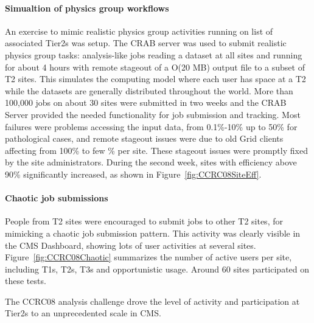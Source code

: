 \paragraph{Simualtion of physics group workflows}
An exercise to mimic realistic physics group activities running
on list of associated Tier2s was setup. 
The CRAB server was used to submit realistic physics group tasks: 
analysis-like jobs reading a dataset at all sites and running for 
about 4 hours with remote stageout of a O(20 MB) output file to a subset of T2
sites. This simulates the computing model where each user has space at a T2 while the datasets are generally distributed throughout the world.
More than 100,000 jobs on about 30 sites were submitted in two weeks and 
the CRAB Server provided the needed functionality for job submission and 
tracking. %
Most failures were problems accessing the input data, from 0.1\%-10\% up to 50\% for pathological cases, and remote stageout issues were due to old Grid clients affecting from 100\% to few \% per site. These stageout issues were
promptly fixed by the site administrators. 
During the second week, sites with efficiency above 90\% significantly increased, as shown in Figure~\ref{fig:CCRC08SiteEff}.
\paragraph{Chaotic job submissions}
People from T2 sites were encouraged to submit jobs to other T2 sites, for mimicking a chaotic job submission pattern. This activity was clearly visible in the CMS Dashboard, showing lots of user activities at several sites. Figure~\ref{fig:CCRC08Chaotic} summarizes the number of active users per site, including T1s, T2s, T3s and opportunistic usage. Around 60 sites participated on these tests.

The CCRC08 analysis challenge drove the level of activity and participation at Tier2s to an unprecedented scale in CMS.

